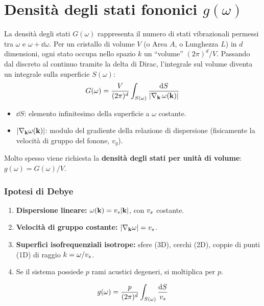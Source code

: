 \newpage


\section{Densità degli stati fononici $g(\omega)$}
\label{sec:dosfononi}
La densità degli stati $G(\omega)$ rappresenta il numero di stati vibrazionali permessi tra $\omega$ e $\omega+\dd\omega$. Per un cristallo di volume $V$ (o Area $A$, o Lunghezza $L$) in $d$ dimensioni, ogni stato occupa nello spazio $k$ un ``volume'' $(2\pi)^d/V$. Passando dal discreto al continuo tramite la delta di Dirac, l'integrale sul volume diventa un integrale sulla superficie $S(\omega)$:
\[ G(\omega) = \frac{V}{(2\pi)^d} \int_{S(\omega)} \frac{\mathrm{d} S}{|\nabla_{\mathbf{k}}\, \omega(\mathbf{k})|} \]
\begin{itemize}
    \item $\dd S$: elemento infinitesimo della superficie a $\omega$ costante.
    \item $|\nabla_{\mathbf{k}} \omega(\mathbf{k})|$: modulo del gradiente della relazione di dispersione (fisicamente la velocità di gruppo del fonone, $v_g$).
\end{itemize}
Molto spesso viene richiesta la \textbf{densità degli stati per unità di volume}: $g(\omega)=G(\omega)/V$.

\subsubsection*{Ipotesi di Debye}
\begin{enumerate}
    \item \textbf{Dispersione lineare:} $\omega(\mathbf{k}) = v_s|\mathbf{k}|$, con $v_s$ costante.
    \item \textbf{Velocità di gruppo costante:} $|\nabla_{\mathbf{k}}\omega| = v_s$.
    \item \textbf{Superfici isofrequenziali isotrope:} sfere (3D), cerchi (2D), coppie di punti (1D) di raggio $k=\omega/v_s$.
    \item Se il sistema possiede $p$ rami acustici degeneri, si moltiplica per $p$.
\end{enumerate}

\[g(\omega) = \frac{p}{(2\pi)^d}\int_{S(\omega)}\frac{\mathrm{d} S}{v_s}\]

\vspace{0.3cm}

